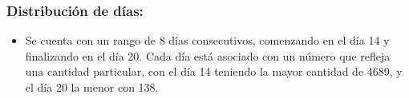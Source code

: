\subsubsection{Distribución de días:}
\begin{itemize}
    \item Se cuenta con un rango de 8 días consecutivos, comenzando en el día 14 y finalizando en el día 20. Cada día está asociado con un número que refleja una cantidad particular, con el día 14 teniendo la mayor cantidad de 4689, y el día 20 la menor con 138.
\end{itemize}


